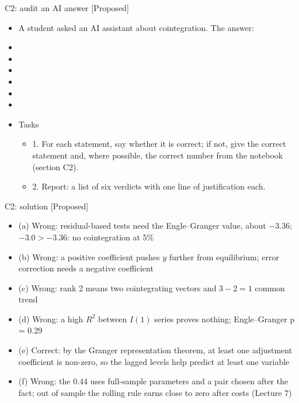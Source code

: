 \begin{frame}{C2: audit an AI answer [Proposed]}
\itemsize{\scriptsize}
\begin{itemize}
    \item A student asked an AI assistant about cointegration. The answer:
    \item {}
    \item {}
    \item {}
    \item {}
    \item {}
    \item {}
    \item Tasks
    \begin{itemize}
        \item 1. For each statement, say whether it is correct; if not, give the correct statement and, where possible, the correct number from the notebook (section C2).
        \item 2. Report: a list of six verdicts with one line of justification each.
    \end{itemize}
\end{itemize}
\end{frame}

\ifsolutions
\begin{frame}{C2: solution [Proposed]}
\itemsize{\scriptsize}
\begin{itemize}
    \item (a) Wrong: residual-based tests need the Engle--Granger value, about $-3.36$; $-3.0 > -3.36$: no cointegration at 5\%
    \item (b) Wrong: a positive coefficient pushes $y$ further from equilibrium; error correction needs a negative coefficient
    \item (c) Wrong: rank 2 means two cointegrating vectors and $3 - 2 = 1$ common trend
    \item (d) Wrong: a high $R^2$ between $I(1)$ series proves nothing; Engle--Granger p = 0.29
    \item (e) Correct: by the Granger representation theorem, at least one adjustment coefficient is non-zero, so the lagged levels help predict at least one variable
    \item (f) Wrong: the 0.44 uses full-sample parameters and a pair chosen after the fact; out of sample the rolling rule earns close to zero after costs (Lecture 7)
\end{itemize}
\end{frame}
\fi


